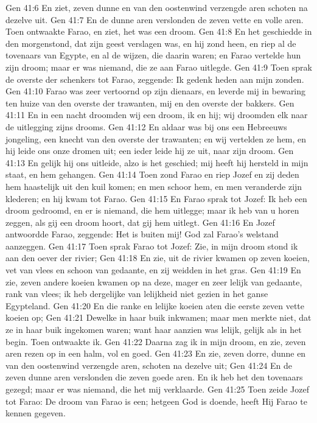 Gen 41:6  En ziet, zeven dunne en van den oostenwind verzengde aren schoten na dezelve uit.
Gen 41:7  En de dunne aren verslonden de zeven vette en volle aren. Toen ontwaakte Farao, en ziet, het was een droom.
Gen 41:8  En het geschiedde in den morgenstond, dat zijn geest verslagen was, en hij zond heen, en riep al de tovenaars van Egypte, en al de wijzen, die daarin waren; en Farao vertelde hun zijn droom; maar er was niemand, die ze aan Farao uitlegde.
Gen 41:9  Toen sprak de overste der schenkers tot Farao, zeggende: Ik gedenk heden aan mijn zonden.
Gen 41:10  Farao was zeer vertoornd op zijn dienaars, en leverde mij in bewaring ten huize van den overste der trawanten, mij en den overste der bakkers.
Gen 41:11  En in een nacht droomden wij een droom, ik en hij; wij droomden elk naar de uitlegging zijns drooms.
Gen 41:12  En aldaar was bij ons een Hebreeuws jongeling, een knecht van den overste der trawanten; en wij vertelden ze hem, en hij leide ons onze dromen uit; een ieder leide hij ze uit, naar zijn droom.
Gen 41:13  En gelijk hij ons uitleide, alzo is het geschied; mij heeft hij hersteld in mijn staat, en hem gehangen.
Gen 41:14  Toen zond Farao en riep Jozef en zij deden hem haastelijk uit den kuil komen; en men schoor hem, en men veranderde zijn klederen; en hij kwam tot Farao.
Gen 41:15  En Farao sprak tot Jozef: Ik heb een droom gedroomd, en er is niemand, die hem uitlegge; maar ik heb van u horen zeggen, als gij een droom hoort, dat gij hem uitlegt.
Gen 41:16  En Jozef antwoordde Farao, zeggende: Het is buiten mij! God zal Farao's welstand aanzeggen.
Gen 41:17  Toen sprak Farao tot Jozef: Zie, in mijn droom stond ik aan den oever der rivier;
Gen 41:18  En zie, uit de rivier kwamen op zeven koeien, vet van vlees en schoon van gedaante, en zij weidden in het gras.
Gen 41:19  En zie, zeven andere koeien kwamen op na deze, mager en zeer lelijk van gedaante, rank van vlees; ik heb dergelijke van lelijkheid niet gezien in het ganse Egypteland.
Gen 41:20  En die ranke en lelijke koeien aten die eerste zeven vette koeien op;
Gen 41:21  Dewelke in haar buik inkwamen; maar men merkte niet, dat ze in haar buik ingekomen waren; want haar aanzien was lelijk, gelijk als in het begin. Toen ontwaakte ik.
Gen 41:22  Daarna zag ik in mijn droom, en zie, zeven aren rezen op in een halm, vol en goed.
Gen 41:23  En zie, zeven dorre, dunne en van den oostenwind verzengde aren, schoten na dezelve uit;
Gen 41:24  En de zeven dunne aren verslonden die zeven goede aren. En ik heb het den tovenaars gezegd; maar er was niemand, die het mij verklaarde.
Gen 41:25  Toen zeide Jozef tot Farao: De droom van Farao is een; hetgeen God is doende, heeft Hij Farao te kennen gegeven.
